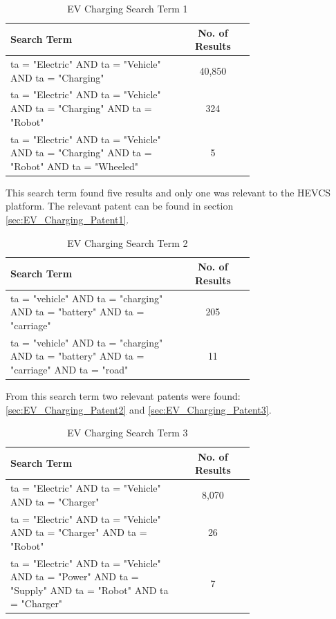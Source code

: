 \documentclass [12pt]{article}
\begin{document}
\begin{table}[H]
    \centering
    \setlength{\arrayrulewidth}{1.5pt}
    \begin{tabular}{|p{0.7\linewidth}|c|}
    \hline
    \cellcolor{gray!40}Search Term & \cellcolor{gray!40}No. of Results \\
    \hline
    ta = "Electric" AND ta = "Vehicle" AND ta = "Charging" & 40,850 \\
    \hline
    ta = "Electric" AND ta = "Vehicle" AND ta = "Charging" AND ta = "Robot" & 324 \\
    \hline
    ta = "Electric" AND ta = "Vehicle" AND ta = "Charging" AND ta = "Robot" AND ta = "Wheeled" & 5 \\
    \hline
    \end{tabular}
    \caption{EV Charging Search Term 1}
    \label{table:EV_Charging_Search_Term1}
\end{table}

This search term found five results and only one was relevant to the HEVCS platform. The relevant patent can be found in section \ref{sec:EV_Charging_Patent1}.

\begin{table}[H]
    \centering
    \setlength{\arrayrulewidth}{1.5pt}
    \begin{tabular}{|p{0.7\linewidth}|c|}
    \hline
    \cellcolor{gray!40}Search Term & \cellcolor{gray!40}No. of Results \\
    \hline
    ta = "vehicle" AND ta = "charging" AND ta = "battery" AND ta = "carriage" & 205 \\
    \hline
    ta = "vehicle" AND ta = "charging" AND ta = "battery" AND ta = "carriage" AND ta = "road" & 11 \\
    \hline
    \end{tabular}
    \caption{EV Charging Search Term 2}
    \label{table:EV_Charging_Search_Term2}
\end{table}

From this search term two relevant patents were found: \ref{sec:EV_Charging_Patent2} and \ref{sec:EV_Charging_Patent3}.

\begin{table}[H]
    \centering
    \setlength{\arrayrulewidth}{1.5pt}
    \begin{tabular}{|p{0.7\linewidth}|c|}
    \hline
    \cellcolor{gray!40}Search Term & \cellcolor{gray!40}No. of Results \\
    \hline
    ta = "Electric" AND ta = "Vehicle" AND ta = "Charger" & 8,070 \\
    \hline
    ta = "Electric" AND ta = "Vehicle" AND ta = "Charger" AND ta = "Robot" & 26 \\
    \hline
    ta = "Electric" AND ta = "Vehicle" AND ta = "Power" AND ta = "Supply" AND ta = "Robot" AND ta = "Charger" & 7 \\
    \hline
    \end{tabular}
    \caption{EV Charging Search Term 3}
    \label{table:EV_Charging_Search_Term3}
\end{table}
\end{document}

